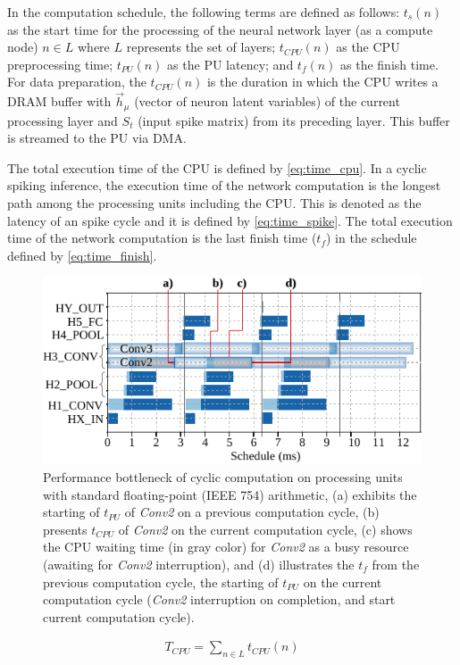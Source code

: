In the computation schedule, the following terms are defined as follows: $t_s(n)$ as the start time for the processing of the neural network layer (as a compute node) $n\in L$ where $L$ represents the set of layers; $t_{CPU}(n)$ as the CPU preprocessing time; $t_{PU}(n)$ as the PU latency; and $t_f(n)$ as the finish time. For data preparation, the $t_{CPU}(n)$ is the duration in which the CPU writes a DRAM buffer with $\vec{h}_\mu$ (vector of neuron latent variables) of the current processing layer and $S_t$ (input spike matrix) from its preceding layer. This buffer is streamed to the PU via DMA.

The total execution time of the CPU is defined by \ref{eq:time_cpu}. In a cyclic spiking inference, the execution time of the network computation is the longest path among the processing units including the CPU. This is denoted as the latency of an spike cycle and it is defined by \ref{eq:time_spike}. The total execution time of the network computation is the last finish time ($t_f$) in the schedule defined by \ref{eq:time_finish}.

\begin{figure}[b!]
	\centering
	\includegraphics[width=0.5\columnwidth]{./chapters/sbs_accelerator/figures/latency_fp_cycle.pdf}
	\caption{Performance bottleneck of cyclic computation on processing units with standard floating-point (IEEE 754) arithmetic, (a) exhibits the starting of $t_{PU}$ of \emph{Conv2} on a previous computation cycle, (b) presents $t_{CPU}$ of \emph{Conv2} on the current computation cycle, (c) shows the CPU waiting time (in gray color) for \emph{Conv2} as a busy resource (awaiting for \emph{Conv2} interruption), and (d) illustrates the $t_{f}$ from the previous computation cycle, the starting of $t_{PU}$ on the current computation cycle (\emph{Conv2} interruption on completion, and start current computation cycle).}
	\label{fig:latency_pu_fp_cycle}
\end{figure}

\begin{eqnarray} \label{eq:time_cpu}
T_{CPU} = \sum_{n\in L} t_{CPU}(n)
\end{eqnarray}

